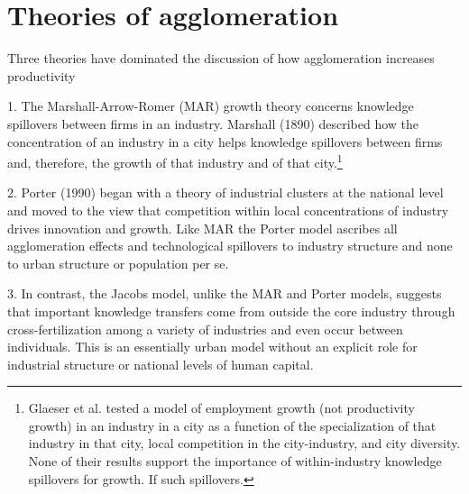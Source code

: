 \section{Theories of agglomeration}
Three theories have dominated the discussion of how agglomeration increases productivity

1. The Marshall-Arrow-Romer (MAR) growth theory concerns knowledge spillovers between firms in an industry.  Marshall (1890) described how the concentration of an industry in a city helps knowledge spillovers between firms and, therefore, the growth of that industry and of that city.\footnote{Glaeser et al. \cite{glaeserGrowthCities1991} tested a model of employment growth (not productivity growth) in an industry in a city as a function of the specialization of that industry in that city, local competition in the city-industry, and city diversity. None of their results support the importance
of within-industry knowledge spillovers for growth. If such spillovers. %
}

 

2. Porter (1990) began with a theory of industrial clusters at the national level and moved to the view that competition within local concentrations of industry drives innovation and growth. Like MAR the Porter model ascribes all agglomeration effects and technological spillovers to industry structure and none to urban structure or population per se.  

3. In contrast, the \gls{Jacobs model}, unlike the MAR and Porter models, suggests that important knowledge transfers come from outside the core industry through cross-fertilization among a variety of industries and even occur between individuals. This is an essentially urban model without an explicit role for industrial structure or national levels of human capital. 

